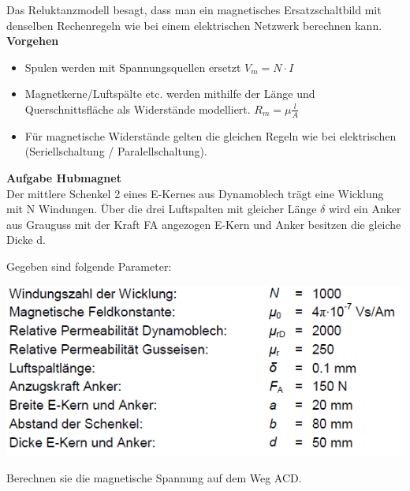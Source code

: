 		\beginip
		Das Reluktanzmodell besagt, dass man ein magnetisches Ersatzschaltbild mit denselben Rechenregeln wie bei einem elektrischen Netzwerk berechnen kann. \\
		\textbf{Vorgehen} \\
		\begin{itemize}
			\item Spulen werden mit Spannungsquellen ersetzt $V_m = N\cdot I$
			\item Magnetkerne/Luftspälte etc. werden mithilfe der Länge und Querschnittsfläche als Widerstände modelliert. $R_m = \mu \frac{l}{A}$
			\item Für magnetische Widerstände gelten die gleichen Regeln wie bei elektrischen (Seriellschaltung / Paralellschaltung).
		\end{itemize}

		\iend
\newpage
		\beginip
 		\textbf{Aufgabe Hubmagnet} \\
		Der mittlere Schenkel 2 eines E-Kernes aus Dynamoblech trägt eine Wicklung mit N Windungen. Über
		die drei Luftspalten mit gleicher Länge $\delta$ wird ein Anker aus Grauguss mit der Kraft FA angezogen
		E-Kern und Anker besitzen die gleiche Dicke d. \\
		\begin{center}
		\end{center}
		Gegeben sind folgende Parameter: \\

		\begin{center}
	\includegraphics[scale=0.6]{img/ex5-3.png}
		\end{center}
		Berechnen sie die magnetische Spannung auf dem Weg ACD.
		\iend


